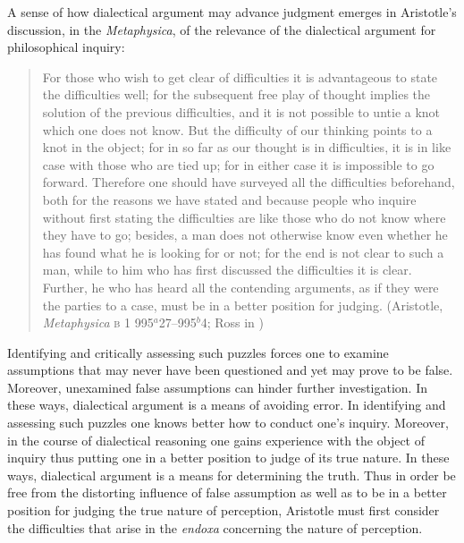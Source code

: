 A sense of how dialectical argument may advance judgment emerges in Aristotle's discussion, in the \emph{Metaphysica}, of the relevance of the dialectical argument for philosophical inquiry:
\begin{quote}
	For those who wish to get clear of difficulties it is advantageous to state the difficulties well; for the subsequent free play of thought implies the solution of the previous difficulties, and it is not possible to untie a knot which one does not know. But the difficulty of our thinking points to a knot in the object; for in so far as our thought is in difficulties, it is in like case with those who are tied up; for in either case it is impossible to go forward. Therefore one should have surveyed all the difficulties beforehand, both for the reasons we have stated and because people who inquire without first stating the difficulties are like those who do not know where they have to go; besides, a man does not otherwise know even whether he has found what he is looking for or not; for the end is not clear to such a man, while to him who has first discussed the difficulties it is clear. Further, he who has heard all the contending arguments, as if they were the parties to a case, must be in a better position for judging. (Aristotle, \emph{Metaphysica} \textsc{b} 1 995\( ^{a} \)27--995\( ^{b} \)4; Ross in \citealt[28]{Barnes:1984kx})
\end{quote}
Identifying and critically assessing such puzzles forces one to examine assumptions that may never have been questioned and yet may prove to be false. Moreover, unexamined false assumptions can hinder further investigation. In these ways, dialectical argument is a means of avoiding error. In identifying and assessing such puzzles one knows better how to conduct one's inquiry. Moreover, in the course of dialectical reasoning one gains experience with the object of inquiry thus putting one in a better position to judge of its true nature. In these ways, dialectical argument is a means for determining the truth. Thus in order be free from the distorting influence of false assumption as well as to be in a better position for judging the true nature of perception, Aristotle must first consider the difficulties that arise in the \emph{endoxa} concerning the nature of perception. 

